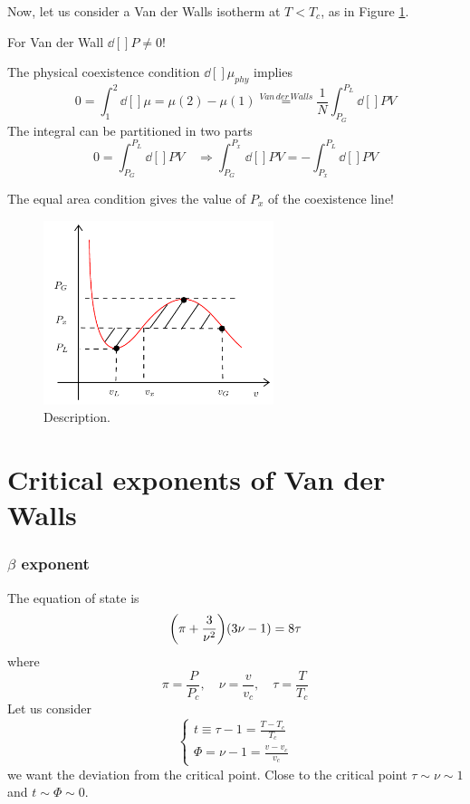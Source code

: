 \documentclass[../main/main.tex]{subfiles}
\begin{document}
Now, let us consider a Van der Walls isotherm at \( T < T_c \), as in Figure \ref{fig:14_4}.
\begin{remark}
For Van der Wall \( \dd[]{P} \neq 0  \)!
\end{remark}
The physical coexistence condition \( \dd[]{\mu }_{phy}  \) implies
\begin{equation}
  0 = \int_{1}^{2} \dd[]{\mu } = \mu (2) - \mu (1) \overset{Van\, der\, Walls}{=} \frac{1}{N} \int_{P_G}^{P_L} \dd[]{P} V
\end{equation}
The integral can be partitioned in two parts
\begin{equation}
  0 = \int_{P_G}^{P_L} \dd[]{P}V \quad \Rightarrow \int_{P_G}^{P_x} \dd[]{P}V = - \int_{P_x}^{P_L} \dd[]{P} V
\end{equation}
\begin{remark}
The equal area condition gives the value of \( P_x \) of the coexistence line!
\end{remark}

\begin{figure}[h!]
\centering
\includegraphics[width=0.6\textwidth]{../lessons/14_image/5.pdf}
\caption{\label{fig:14_4} Description.}
\end{figure}

\section{Critical exponents of Van der Walls}

\subsubsection{\( \beta  \) exponent}
The equation of state is
\begin{equation}
  \qty(\pi + \frac{3}{\nu ^2}) \qty(3 \nu - 1) = 8 \tau
\end{equation}
where
\begin{equation}
  \pi = \frac{P}{P_c}, \quad \nu = \frac{v }{v_c}, \quad \tau = \frac{T}{T_c}
\end{equation}
Let us consider
\begin{equation}
  \begin{cases}
   t \equiv \tau -1 = \frac{T-T_c}{T_c} \\
   \Phi = \nu -1 = \frac{v-v_c}{v_c}
  \end{cases}
\end{equation}
we want the deviation from the critical point.
Close to the critical point \( \tau \sim \nu \sim 1 \) and \( t \sim \Phi \sim 0 \).
\end{document}

